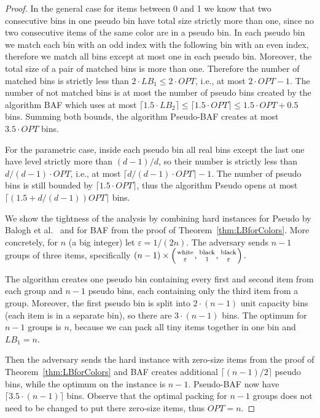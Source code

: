 \documentclass[11pt,a4paper]{article}
\def\vari#1{\mathit{#1}}
\newcommand*{\nolinefrac}[2]{\genfrac{}{}{0pt}{1}{#1}{#2}}
\begin{document}
\begin{proof}
In the general case for items between 0 and 1 we know that two
consecutive bins in one pseudo bin have total size strictly more than one,
since no two consecutive items of the same color are in a pseudo bin.
In each pseudo bin we match each bin with an odd index with the following bin
with an even index, therefore we match all bins except at most one in each pseudo bin.
Moreover, the total size of a pair of matched bins is more than one.
Therefore the number of matched bins is strictly less than $2 \cdot \vari{LB_1} \leq 2 \cdot \vari{OPT}$,
i.e., at most $2 \cdot \vari{OPT} - 1$.
The number of not matched bins is at most the number of pseudo bins
created by the algorithm BAF which uses at most
$\lceil 1.5 \cdot \vari{LB_2}\rceil \leq \lceil 1.5 \cdot \vari{OPT}\rceil \leq 1.5 \cdot \vari{OPT} + 0.5$ bins.
Summing both bounds, the algorithm Pseudo-BAF creates at most $3.5 \cdot \vari{OPT}$ bins.

For the parametric case, inside each pseudo bin all real bins except the last one
have level strictly more than $(d - 1)/d$, so their number is strictly less than $d/(d-1) \cdot \vari{OPT}$,
i.e., at most $\lceil d/(d-1) \cdot \vari{OPT}\rceil - 1$.  
The number of pseudo bins is still bounded by $\lceil 1.5 \cdot \vari{OPT}\rceil$,
thus the algorithm Pseudo opens at most $\lceil (1.5 + d/(d-1))\vari{OPT}\rceil $ bins.

We show the tightness of the analysis by combining hard instances
for Pseudo by Balogh et al.~\cite{balogh14}
and for BAF from the proof of Theorem~\ref{thm:LBforColors}.
More concretely, for $n$ (a big integer) let $\varepsilon = 1/(2n)$.
The adversary sends $n - 1$ groups of three items, specifically
$(n - 1) \times \left( \nolinefrac{\mathrm{white}}{\varepsilon}, \nolinefrac{\mathrm{black}}{1},
\nolinefrac{\mathrm{black}}{\varepsilon} \right).$

The algorithm creates one pseudo bin containing every first and second item from each group and $n - 1$ pseudo bins,
each containing only the third item from a group.
Moreover, the first pseudo bin is split into $2 \cdot (n - 1)$ unit capacity bins (each item is in a separate bin), so there are $3 \cdot (n - 1)$ bins.
The optimum for $n - 1$ groups is $n$, because we can pack all tiny items together in one bin and $\vari{LB_1} = n$.

Then the adversary sends the hard instance with zero-size items from the proof of Theorem~\ref{thm:LBforColors}
and BAF creates additional $\lceil (n - 1)/2 \rceil$ pseudo bins,
while the optimum on the instance is $n - 1$. Pseudo-BAF now have $\lceil 3.5 \cdot (n - 1) \rceil$ bins.
Observe that the optimal packing for $n - 1$ groups does not need to be changed to put there zero-size items, thus $\vari{OPT} = n$.


\end{proof}
\end{document}
